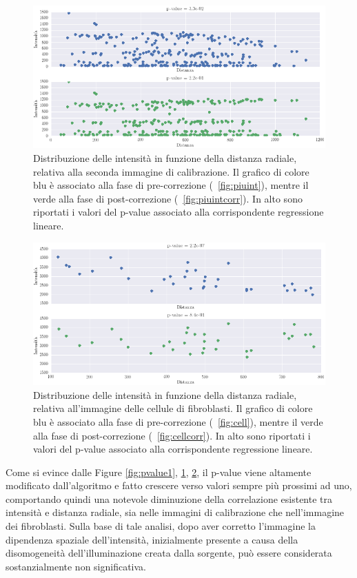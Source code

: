 \begin{figure}
 \centering
 \includegraphics[scale=.55]{img/CAP4pvalue2.png}
 \caption{\small{Distribuzione delle intensità in funzione della distanza radiale, relativa alla seconda immagine di calibrazione. Il grafico di colore blu è associato alla fase di pre-correzione (\figurename~\ref{fig:piuint}), mentre il verde alla fase di post-correzione (\figurename~\ref{fig:piuintcorr}). In alto sono riportati i valori del p-value associato alla corrispondente regressione lineare.}}
 \label{fig:pvalue2}
\end{figure}

\begin{figure}
 \centering
 \includegraphics[scale=.55]{img/CAP4pvalue3.png}
 \caption{\small{
 Distribuzione delle intensità in funzione della distanza radiale, relativa all'immagine delle cellule di fibroblasti. Il grafico di colore blu è associato alla fase di pre-correzione (\figurename~\ref{fig:cell}), mentre il verde alla fase di post-correzione (\figurename~\ref{fig:cellcorr}). In alto sono riportati i valori del p-value associato alla corrispondente regressione lineare.}}
 \label{fig:pvalue3}
\end{figure}

Come si evince dalle Figure \ref{fig:pvalue1}, \ref{fig:pvalue2}, \ref{fig:pvalue3}, il p-value viene altamente modificato dall'algoritmo e fatto crescere verso valori sempre più prossimi ad uno, comportando quindi una notevole diminuzione della correlazione esistente tra intensità e distanza radiale, sia nelle immagini di calibrazione che nell'immagine dei fibroblasti. 
Sulla base di tale analisi, dopo aver corretto l'immagine la dipendenza spaziale dell'intensità, inizialmente presente a causa della disomogeneità dell'illuminazione creata dalla sorgente, può essere considerata sostanzialmente non significativa.


